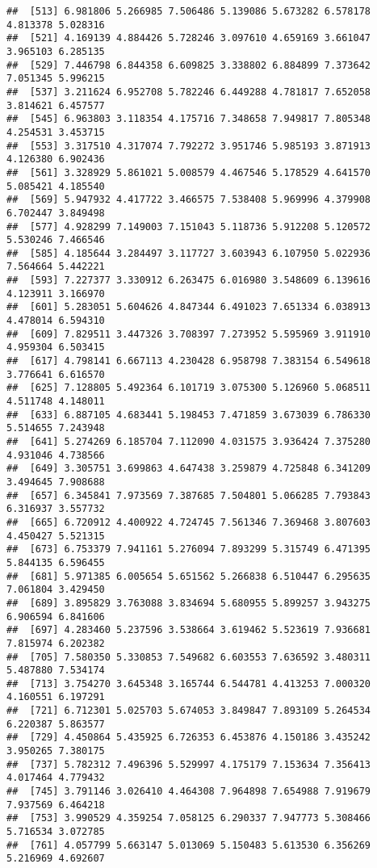 \documentclass[
]{article}
\begin{document}
\begin{verbatim}
##  [513] 6.981806 5.266985 7.506486 5.139086 5.673282 6.578178 4.813378 5.028316
##  [521] 4.169139 4.884426 5.728246 3.097610 4.659169 3.661047 3.965103 6.285135
##  [529] 7.446798 6.844358 6.609825 3.338802 6.884899 7.373642 7.051345 5.996215
##  [537] 3.211624 6.952708 5.782246 6.449288 4.781817 7.652058 3.814621 6.457577
##  [545] 6.963803 3.118354 4.175716 7.348658 7.949817 7.805348 4.254531 3.453715
##  [553] 3.317510 4.317074 7.792272 3.951746 5.985193 3.871913 4.126380 6.902436
##  [561] 3.328929 5.861021 5.008579 4.467546 5.178529 4.641570 5.085421 4.185540
##  [569] 5.947932 4.417722 3.466575 7.538408 5.969996 4.379908 6.702447 3.849498
##  [577] 4.928299 7.149003 7.151043 5.118736 5.912208 5.120572 5.530246 7.466546
##  [585] 4.185644 3.284497 3.117727 3.603943 6.107950 5.022936 7.564664 5.442221
##  [593] 7.227377 3.330912 6.263475 6.016980 3.548609 6.139616 4.123911 3.166970
##  [601] 5.283051 5.604626 4.847344 6.491023 7.651334 6.038913 4.478014 6.594310
##  [609] 7.829511 3.447326 3.708397 7.273952 5.595969 3.911910 4.959304 6.503415
##  [617] 4.798141 6.667113 4.230428 6.958798 7.383154 6.549618 3.776641 6.616570
##  [625] 7.128805 5.492364 6.101719 3.075300 5.126960 5.068511 4.511748 4.148011
##  [633] 6.887105 4.683441 5.198453 7.471859 3.673039 6.786330 5.514655 7.243948
##  [641] 5.274269 6.185704 7.112090 4.031575 3.936424 7.375280 4.931046 4.738566
##  [649] 3.305751 3.699863 4.647438 3.259879 4.725848 6.341209 3.494645 7.908688
##  [657] 6.345841 7.973569 7.387685 7.504801 5.066285 7.793843 6.316937 3.557732
##  [665] 6.720912 4.400922 4.724745 7.561346 7.369468 3.807603 4.450427 5.521315
##  [673] 6.753379 7.941161 5.276094 7.893299 5.315749 6.471395 5.844135 6.596455
##  [681] 5.971385 6.005654 5.651562 5.266838 6.510447 6.295635 7.061804 3.429450
##  [689] 3.895829 3.763088 3.834694 5.680955 5.899257 3.943275 6.906594 6.841606
##  [697] 4.283460 5.237596 3.538664 3.619462 5.523619 7.936681 7.815974 6.202382
##  [705] 7.580350 5.330853 7.549682 6.603553 7.636592 3.480311 5.487880 7.534174
##  [713] 3.754270 3.645348 3.165744 6.544781 4.413253 7.000320 4.160551 6.197291
##  [721] 6.712301 5.025703 5.674053 3.849847 7.893109 5.264534 6.220387 5.863577
##  [729] 4.450864 5.435925 6.726353 6.453876 4.150186 3.435242 3.950265 7.380175
##  [737] 5.782312 7.496396 5.529997 4.175179 7.153634 7.356413 4.017464 4.779432
##  [745] 3.791146 3.026410 4.464308 7.964898 7.654988 7.919679 7.937569 6.464218
##  [753] 3.990529 4.359254 7.058125 6.290337 7.947773 5.308466 5.716534 3.072785
##  [761] 4.057799 5.663147 5.013069 5.150483 5.613530 6.356269 5.216969 4.692607

\end{verbatim}
\end{document}
